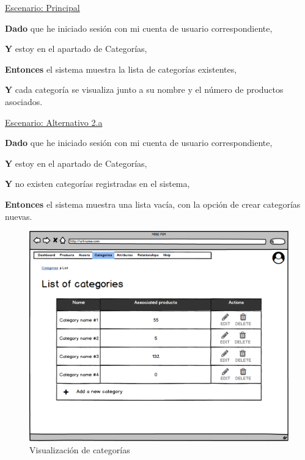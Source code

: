 \underline{Escenario: Principal}\par
\vspace{0.15cm}

\textbf{Dado} que he iniciado sesión con mi cuenta de usuario correspondiente,\par
\textbf{Y} estoy en el apartado de Categorías,\par
\textbf{Entonces} el sistema muestra la lista de categorías existentes,\par
\textbf{Y} cada categoría se visualiza junto a su nombre y el número de productos asociados.\par


\vspace{0.20cm}

\underline{Escenario: Alternativo 2.a}\par
\vspace{0.15cm}

\textbf{Dado} que he iniciado sesión con mi cuenta de usuario correspondiente,\par
\textbf{Y} estoy en el apartado de Categorías,\par
\textbf{Y} no existen categorías registradas en el sistema,\par
\textbf{Entonces} el sistema muestra una lista vacía, con la opción de crear categorías nuevas.\par

\vspace{0.20cm}

\begin{figure}[H]
    \includegraphics[width=1\linewidth]{mockups/RF4.2_1.png}
    \caption{Visualización de categorías}
   \end{figure}
\vspace{1.0cm}

